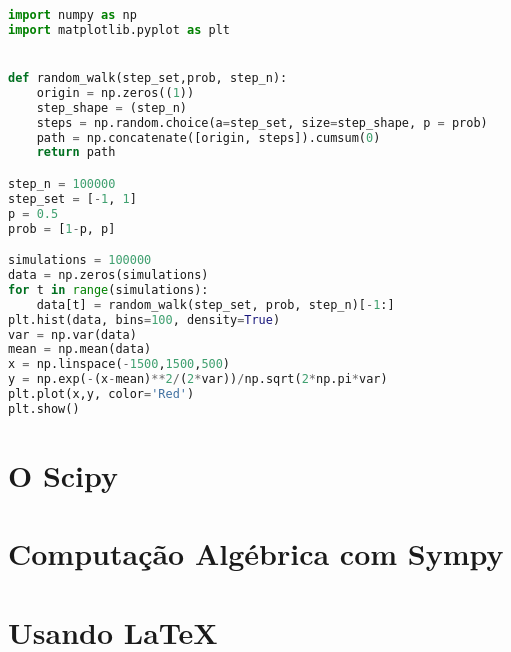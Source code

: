 \documentclass[12pt,a4paper,titlepage,portuges,twoside,final]{book}
\begin{document}
\begin{lstlisting}[language=Python, frame=lines,basicstyle=\footnotesize, caption={Histogram da Distribuição de Probabilidade da caminhada Aleatória}, label={lst:RW}]
import numpy as np
import matplotlib.pyplot as plt


def random_walk(step_set,prob, step_n):
    origin = np.zeros((1)) 
    step_shape = (step_n)
    steps = np.random.choice(a=step_set, size=step_shape, p = prob)
    path = np.concatenate([origin, steps]).cumsum(0)
    return path

step_n = 100000
step_set = [-1, 1]
p = 0.5
prob = [1-p, p]

simulations = 100000
data = np.zeros(simulations)
for t in range(simulations):
    data[t] = random_walk(step_set, prob, step_n)[-1:]
plt.hist(data, bins=100, density=True)
var = np.var(data)
mean = np.mean(data)
x = np.linspace(-1500,1500,500)
y = np.exp(-(x-mean)**2/(2*var))/np.sqrt(2*np.pi*var)
plt.plot(x,y, color='Red')
plt.show()    

\end{lstlisting}




\chapter{O Scipy}

\chapter{Computação Algébrica com Sympy}






\chapter{Usando \LaTeX}\label{a:latex}



\end{document}
